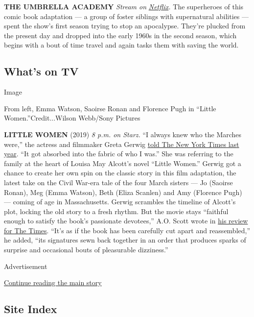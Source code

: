 \textbf{THE UMBRELLA ACADEMY} \emph{Stream on}
\href{https://www.netflix.com/title/80186863}{\emph{Netflix}}\emph{.}
The superheroes of this comic book adaptation --- a group of foster
siblings with supernatural abilities --- spent the show's first season
trying to stop an apocalypse. They're plucked from the present day and
dropped into the early 1960s in the second season, which begins with a
bout of time travel and again tasks them with saving the world.

\hypertarget{whats-on-tv}{%
\subsection{What's on TV}\label{whats-on-tv}}

Image

From left, Emma Watson, Saoirse Ronan and Florence Pugh in ``Little
Women.''Credit...Wilson Webb/Sony Pictures

\textbf{LITTLE WOMEN} (2019) \emph{8 p.m. on Starz.} ``I always knew who
the Marches were,'' the actress and filmmaker Greta Gerwig
\href{https://www.nytimes.com/2019/12/23/movies/little-women-review.html}{told
The New York Times last year}. ``It got absorbed into the fabric of who
I was.'' She was referring to the family at the heart of Louisa May
Alcott's novel ``Little Women.'' Gerwig got a chance to create her own
spin on the classic story in this film adaptation, the latest take on
the Civil War-era tale of the four March sisters --- Jo (Saoirse Ronan),
Meg (Emma Watson), Beth (Eliza Scanlen) and Amy (Florence Pugh) ---
coming of age in Massachusetts. Gerwig scrambles the timeline of
Alcott's plot, locking the old story to a fresh rhythm. But the movie
stays ``faithful enough to satisfy the book's passionate devotees,''
A.O. Scott wrote in
\href{https://www.nytimes.com/2019/12/23/movies/little-women-review.html}{his
review for The Times}. ``It's as if the book has been carefully cut
apart and reassembled,'' he added, ``its signatures sewn back together
in an order that produces sparks of surprise and occasional bouts of
pleasurable dizziness.''

Advertisement

\protect\hyperlink{after-bottom}{Continue reading the main story}

\hypertarget{site-index}{%
\subsection{Site Index}\label{site-index}}

